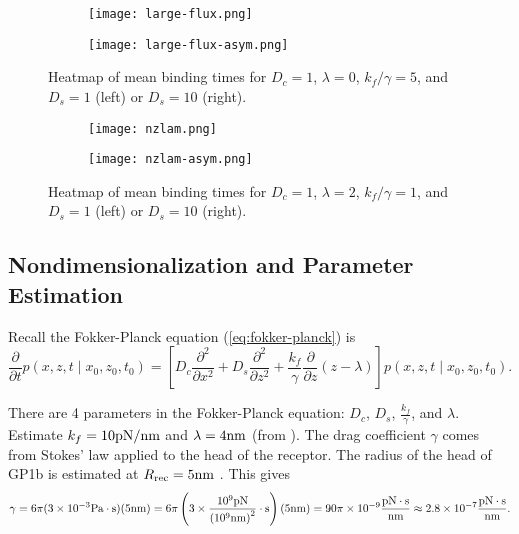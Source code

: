 \documentclass{article}
\newcommand{\tn}{\textnormal}
\newcommand{\stiff}{\frac{k_f}{\gamma}}
\newcommand{\Pder}[2]{\frac{\partial #1}{\partial #2}}
\newcommand{\xdiff}{\frac{\partial^2}{\partial x^2}}
\newcommand{\zdiff}{\frac{\partial^2}{\partial z^2}}
\begin{document}
\begin{figure}[p]
  \begin{subfigure}{0.48\textwidth}
    \centering
    \texttt{[image: large-flux.png]}
    \label{fig:large-flux-sym}
  \end{subfigure}
  \hfill
  \begin{subfigure}{0.48\textwidth}
    \centering
    \texttt{[image: large-flux-asym.png]}
    \label{fig:large-flux-asym}
  \end{subfigure}
  \caption{Heatmap of mean binding times for $D_c = 1$, $\lambda = 0$,
    $k_f/\gamma = 5$, and $D_s = 1$ (left) or $D_s = 10$ (right).}
  \label{fig:large-flux}
\end{figure}

\begin{figure}[p]
  \begin{subfigure}{0.48\textwidth}
    \centering
    \texttt{[image: nzlam.png]}
    \label{fig:nzlam-sym}
  \end{subfigure}
  \hfill
  \begin{subfigure}{0.48\textwidth}
    \centering
    \texttt{[image: nzlam-asym.png]}
    \label{fig:nzlam-asym}
  \end{subfigure}
  \caption{Heatmap of mean binding times for $D_c = 1$, $\lambda = 2$,
    $k_f/\gamma = 1$, and $D_s = 1$ (left) or $D_s = 10$ (right).}
  \label{fig:nzlam}
\end{figure}

\subsection{Nondimensionalization and Parameter Estimation}
\label{sec:nondim}

Recall the Fokker-Planck equation (\ref{eq:fokker-planck}) is
\begin{equation*}
  \Pder{}{t}p(x, z, t \mid x_0, z_0, t_0) = \left[D_c \xdiff + D_s
    \zdiff + \stiff \Pder{}{z} (z - \lambda)\right] p(x, z, t \mid
  x_0, z_0, t_0).
\end{equation*}

There are 4 parameters in the Fokker-Planck equation: $D_c$, $D_s$,
$\stiff$, and $\lambda$. Estimate $k_f = 10 \tn{pN}/\tn{nm}$ and
$\lambda = 4 \tn{nm}$ (from \cite{Dayananda2010,Fox1988}). The drag
coefficient $\gamma$ comes from Stokes' law applied to the head of the
receptor. The radius of the head of GP1b is estimated at
$R_\tn{rec} = 5 \tn{nm}$ \cite{Dayananda2010,Fox1988}. This gives
\begin{equation}
  \gamma = 6\pi (3 \times 10^{-3} \tn{Pa}\cdot\tn{s}) (5 \tn{nm}) =
  6\pi \left(3\times \frac{10^{9} \tn{pN}}{\left(10^9
        \tn{nm}\right)^2} \cdot \tn{s} \right) (5 \tn{nm}) = 90\pi
  \times 10^{-9} \frac{\tn{pN}\cdot\tn{s}}{\tn{nm}} \approx 2.8 \times
  10^{-7} \frac{\tn{pN}\cdot\tn{s}}{\tn{nm}}.
\end{equation}
\end{document}
